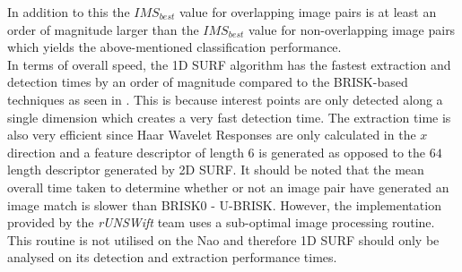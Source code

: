 In addition to this the $IMS_{best}$ value for overlapping image pairs is at least an order of magnitude larger than the $IMS_{best}$ value for non-overlapping image pairs which yields the above-mentioned classification performance. \\




In terms of overall speed, the 1D SURF algorithm has the fastest extraction and detection times by an order of magnitude compared to the BRISK-based techniques as seen in . This is because interest points are only detected along a single dimension which creates a very fast detection time. The extraction time is also very efficient since Haar Wavelet Responses are only calculated in the $x$ direction and a feature descriptor of length $6$ is generated as opposed to the $64$ length descriptor generated by 2D SURF. It should be noted that the mean overall time taken to determine whether or not an image pair have generated an image match is slower than BRISK0 - U-BRISK. However, the implementation provided by the \textit{rUNSWift} team uses a sub-optimal image processing routine. This routine is not utilised on the Nao and therefore 1D SURF should only be analysed on its detection and extraction performance times.\\

